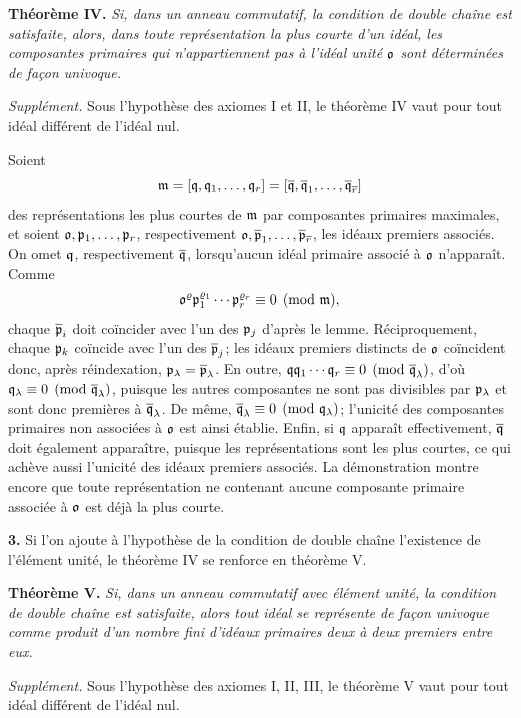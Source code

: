 \textbf{Théorème IV.} \emph{Si, dans un anneau commutatif, la condition de double chaîne est satisfaite, alors, dans toute représentation la plus courte d'un idéal, les composantes primaires qui n'appartiennent pas à l'idéal unité $\mathfrak{o}$ sont déterminées de façon univoque.}

\emph{Supplément.} Sous l'hypothèse des axiomes I et II, le théorème IV vaut pour tout idéal différent de l'idéal nul.

Soient
\[
\mathfrak{m}=[\mathfrak{q},\mathfrak{q}_1,\ldots,\mathfrak{q}_r]
   =[\overline{\mathfrak{q}},\overline{\mathfrak{q}}_1,\ldots,\overline{\mathfrak{q}}_{\overline{r}}]
\]
des représentations les plus courtes de $\mathfrak{m}$ par composantes primaires maximales, et soient
$\mathfrak{o},\mathfrak{p}_1,\ldots,\mathfrak{p}_r$, respectivement
$\mathfrak{o},\overline{\mathfrak{p}}_1,\ldots,\overline{\mathfrak{p}}_{\overline{r}}$, les idéaux premiers associés. On omet $\mathfrak{q}$, respectivement $\overline{\mathfrak{q}}$, lorsqu'aucun idéal primaire associé à $\mathfrak{o}$ n'apparaît. Comme
\[
\mathfrak{o}^\varrho\mathfrak{p}_1^{\varrho_1}\cdots\mathfrak{p}_r^{\varrho_r}
   \equiv0\pmod{\mathfrak{m}},
\]
chaque $\overline{\mathfrak{p}}_i$ doit coïncider avec l'un des $\mathfrak{p}_j$ d'après le lemme. Réciproquement, chaque $\mathfrak{p}_k$ coïncide avec l'un des $\overline{\mathfrak{p}}_j$; les idéaux premiers distincts de $\mathfrak{o}$ coïncident donc, après réindexation, $\mathfrak{p}_\lambda=\overline{\mathfrak{p}}_\lambda$. En outre,
$\mathfrak{q}\mathfrak{q}_1\cdots\mathfrak{q}_r\equiv0\pmod{\overline{\mathfrak{q}}_\lambda}$, d'où
$\mathfrak{q}_\lambda\equiv0\pmod{\overline{\mathfrak{q}}_\lambda}$, puisque les autres composantes ne sont pas divisibles par $\mathfrak{p}_\lambda$ et sont donc premières à $\overline{\mathfrak{q}}_\lambda$. De même,
$\overline{\mathfrak{q}}_\lambda\equiv0\pmod{\mathfrak{q}_\lambda}$; l'unicité des composantes primaires non associées à $\mathfrak{o}$ est ainsi établie. Enfin, si $\mathfrak{q}$ apparaît effectivement, $\overline{\mathfrak{q}}$ doit également apparaître, puisque les représentations sont les plus courtes, ce qui achève aussi l'unicité des idéaux premiers associés. La démonstration montre encore que toute représentation ne contenant aucune composante primaire associée à $\mathfrak{o}$ est déjà la plus courte.

\textbf{3.} Si l'on ajoute à l'hypothèse de la condition de double chaîne l'existence de l'élément unité, le théorème IV se renforce en théorème V.

\textbf{Théorème V.} \emph{Si, dans un anneau commutatif avec élément unité, la condition de double chaîne est satisfaite, alors tout idéal se représente de façon univoque comme produit d'un nombre fini d'idéaux primaires deux à deux premiers entre eux.}

\emph{Supplément.} Sous l'hypothèse des axiomes I, II, III, le théorème V vaut pour tout idéal différent de l'idéal nul.

